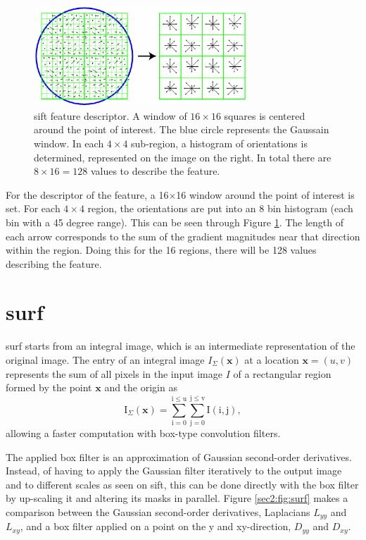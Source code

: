 \begin{figure}
	\centering
	\includegraphics[width=8cm]{images/sift3.png}
	\caption[\acrshort{sift} feature descriptor]{\acrshort{sift} feature descriptor. A window of $16\times16$ squares is centered around the point of interest. The blue circle represents the Gaussain window. In each $4\times4$ sub-region, a histogram of orientations is determined, represented on the image on the right. In total there are $8\times 16 = 128$ values to describe the feature. \cite{sift}}
	\label{sec2:fig:sift3}
\end{figure}
For the descriptor of the feature, a 16$\times$16 window around the point of interest is set. For each $4\times4$ region, the orientations are put into an 8 bin histogram (each bin with a 45 degree range). This can be seen through Figure \ref{sec2:fig:sift3}. The length of each arrow corresponds to the sum of the gradient magnitudes near that direction within the region. Doing this for the 16 regions, there will be 128 values describing the feature.
\cite{sift}

\section{\acrlong{surf}}
\label{appendix:cha1:surf}
\acrshort{surf} starts from an integral image, which is an intermediate representation of the
original image. The entry of an integral image $I_{\Sigma}( \mathbf{x})$ at a location
$\mathbf{x} = (u, v)$ represents the sum of all pixels in the input image $I$ of a rectangular region formed by the point $\mathbf{x}$ and the origin as 
\begin{equation}
\label{sec2:eq:int}
\mathrm { I } _ { \Sigma } ( \mathbf{x} ) = \sum _ { \mathrm { i } = 0 } ^ { \mathrm { i } \leq \mathrm { u } } \sum _ { \mathrm { j } = 0 } ^ { \mathrm { j } \leq \mathrm { v } } \mathrm { I } ( \mathrm { i } , \mathrm { j } ),
\end{equation}
allowing a faster computation with box-type convolution filters. 

The applied box filter is an approximation of Gaussian second-order derivatives. Instead, of having to apply the Gaussian filter iteratively to the output image and to different scales as seen on \acrshort{sift}, this can be done directly with the box filter by up-scaling it and altering its masks in parallel. Figure \ref{sec2:fig:surf} makes a comparison between the Gaussian second-order derivatives, Laplacians $L_{yy}$ and $L_{xy}$, and a box filter applied on a point on the y and xy-direction, $D_{yy}$ and $D_{xy}$.

